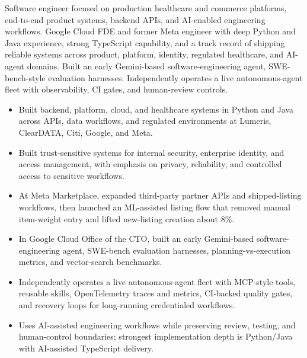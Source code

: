 


Software engineer focused on production healthcare and commerce platforms, end-to-end product systems, backend APIs, and AI-enabled engineering workflows. Google Cloud FDE and former Meta engineer with deep Python and Java experience, strong TypeScript capability, and a track record of shipping reliable systems across product, platform, identity, regulated healthcare, and AI-agent domains. Built an early Gemini-based software-engineering agent, SWE-bench-style evaluation harnesses. Independently operates a live autonomous-agent fleet with observability, CI gates, and human-review controls.
\begin{itemize}
  \item Built backend, platform, cloud, and healthcare systems in Python and Java across APIs, data workflows, and regulated environments at Lumeris, ClearDATA, Citi, Google, and Meta.
  \item Built trust-sensitive systems for internal security, enterprise identity, and access management, with emphasis on privacy, reliability, and controlled access to sensitive workflows.
  \item At Meta Marketplace, expanded third-party partner APIs and shipped-listing workflows, then launched an ML-assisted listing flow that removed manual item-weight entry and lifted new-listing creation about 8\%.
\end{itemize}
\begin{itemize}
  \item In Google Cloud Office of the CTO, built an early Gemini-based software-engineering agent, SWE-bench evaluation harnesses, planning-vs-execution metrics, and vector-search benchmarks.
  \item Independently operates a live autonomous-agent fleet with MCP-style tools, reusable skills, OpenTelemetry traces and metrics, CI-backed quality gates, and recovery loops for long-running credentialed workflows.
  \item Uses AI-assisted engineering workflows while preserving review, testing, and human-control boundaries; strongest implementation depth is Python/Java with AI-assisted TypeScript delivery.
\end{itemize}




